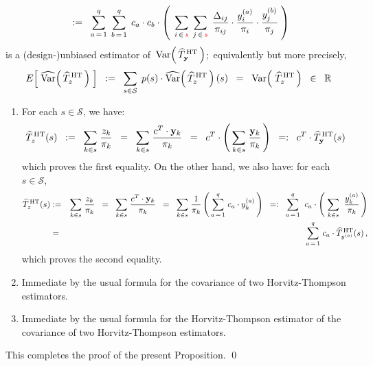 \begin{proposition}
\begin{enumerate}
\begin{equation*}
	\;\; := \;\;
		\overset{q}{\underset{a\,=\,1}{\sum}}\;\,
		\overset{q}{\underset{b\,=\,1}{\sum}}\;\,
		c_{a} \cdot c_{b} \cdot
		\left(\;\,
			\underset{i\,\in\,{\color{red}s}}{\sum}\;\,
			\underset{j\,\in\,{\color{red}s}}{\sum}\;\,
			\dfrac{\Delta_{ij}}{\pi_{ij}} \cdot \dfrac{y^{(a)}_{i}}{\pi_{i}} \cdot \dfrac{y^{(b)}_{j}}{\pi_{j}}
		\;\right)
	\end{equation*}
	is a (design-)unbiased estimator of \,$\textnormal{Var}\!\left(\,\widehat{T}^{\,\textnormal{HT}}_{\mathbf{y}}\,\right)$;\,
	equivalently but more precisely,
	\begin{equation*}
	E\!\left[\; \widehat{\textnormal{Var}}\!\left(\,\widehat{T}^{\,\textnormal{HT}}_{z}\,\right) \;\right]
	\;\; := \;\;
		\underset{s\in\mathcal{S}}{\sum}\;\,
		p(s) \cdot \widehat{\textnormal{Var}}\!\left(\,\widehat{T}^{\,\textnormal{HT}}_{z}\,\right)(s)
	\;\; = \;\;
		\textnormal{Var}\!\left(\;\widehat{T}^{\,\textnormal{HT}}_{z}\,\right)
	\;\; \in \;\;
		\mathbb{R}
	\end{equation*}
\end{enumerate}
\end{proposition}
\proof
\begin{enumerate}
\item
	For each $s \in \mathcal{S}$, we have:
	\begin{equation*}
	\widehat{T}^{\,\textnormal{HT}}_{z}(s)
	\;\; := \;\;
		\underset{k \in s}{\sum}\;\dfrac{z_{k}}{\pi_{k}}
	\;\; = \;\;
		\underset{k \in s}{\sum}\;\dfrac{c^{T} \cdot \mathbf{y}_{k}}{\pi_{k}}
	\;\; = \;\;
		c^{T} \cdot \left(\, \underset{k \in s}{\sum}\;\dfrac{\mathbf{y}_{k}}{\pi_{k}} \,\right)
	\;\; =: \;\;
		c^{T} \cdot \widehat{T}^{\,\textnormal{HT}}_{\mathbf{y}}(s)\,
	\end{equation*}
	which proves the first equality.
	On the other hand, we also have: for each $s \in \mathcal{S}$,
	\begin{eqnarray*}
	\widehat{T}^{\,\textnormal{HT}}_{z}(s)
	& := &
		\underset{k \in s}{\sum}\;\dfrac{z_{k}}{\pi_{k}}
	\;\; = \;\;
		\underset{k \in s}{\sum}\;\dfrac{c^{T} \cdot \mathbf{y}_{k}}{\pi_{k}}
	\;\; = \;\;
		\underset{k \in s}{\sum}\; \dfrac{1}{\pi_{k}} \left(\, \overset{q}{\underset{a\,=\,1}{\sum}}\; c_{a} \cdot y^{(a)}_{k} \,\right)
	\;\; =: \;\;
		\overset{q}{\underset{a\,=\,1}{\sum}}\;\;
		c_{a} \cdot \left(\;
			\underset{k \in s}{\sum}\;\; \dfrac{ y^{(a)}_{k} }{ \pi_{k} }
		\,\right)		
	\\
	& = &
		\overset{q}{\underset{a\,=\,1}{\sum}}\;
		c_{a} \cdot \widehat{T}^{\,\textnormal{HT}}_{y^{(a)}}(s)\,,
	\end{eqnarray*}
	which proves the second equality.
\item
	Immediate by the usual formula for the covariance of two Horvitz-Thompson estimators.
\item
	Immediate by the usual formula for the Horvitz-Thompson estimator of the covariance of two Horvitz-Thompson estimators.
\end{enumerate}
This completes the proof of the present Proposition.
\qed

